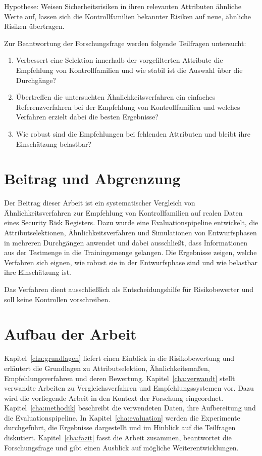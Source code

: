 Hypothese: Weisen Sicherheitsrisiken in ihren relevanten Attributen ähnliche
Werte auf, lassen sich die Kontrollfamilien bekannter Risiken auf neue, ähnliche
Risiken übertragen.

Zur Beantwortung der Forschungsfrage werden folgende Teilfragen untersucht:

\begin{enumerate}
  \item\label{tf: attribute} Verbessert eine Selektion innerhalb der vorgefilterten Attribute die Empfehlung von Kontrollfamilien und wie stabil ist die Auswahl über die Durchgänge?
  \item\label{tf: methoden} Übertreffen die untersuchten Ähnlichkeitsverfahren ein einfaches Referenzverfahren bei der Empfehlung von Kontrollfamilien und welches Verfahren erzielt dabei die besten Ergebnisse?
  \item\label{tf: robustheit} Wie robust sind die Empfehlungen bei fehlenden Attributen und bleibt ihre Einschätzung belastbar?
\end{enumerate}

\section{Beitrag und Abgrenzung}\label{sec:beitrag}
Der Beitrag dieser Arbeit ist ein systematischer Vergleich von Ähnlichkeitsverfahren zur Empfehlung von Kontrollfamilien auf realen Daten eines Security Risk Registers.
Dazu wurde eine Evaluationspipeline entwickelt, die Attributselektionen, Ähnlichkeitsverfahren und Simulationen von Entwurfsphasen in mehreren Durchgängen anwendet und dabei ausschließt, dass Informationen aus der Testmenge in die Trainingsmenge gelangen.
Die Ergebnisse zeigen, welche Verfahren sich eignen, wie robust sie in der Entwurfsphase sind und wie belastbar ihre Einschätzung ist.

Das Verfahren dient ausschließlich als Entscheidungshilfe für Risikobewerter und soll keine Kontrollen vorschreiben.

\section{Aufbau der Arbeit}\label{sec:aufbau}
Kapitel~\ref{cha:grundlagen} liefert einen Einblick in die Risikobewertung und erläutert die Grundlagen zu Attributselektion, Ähnlichkeitsmaßen, Empfehlungsverfahren und deren Bewertung.
Kapitel~\ref{cha:verwandt} stellt verwandte Arbeiten zu Vergleichsverfahren und Empfehlungssystemen vor.
Dazu wird die vorliegende Arbeit in den Kontext der Forschung eingeordnet.
Kapitel~\ref{cha:methodik} beschreibt die verwendeten Daten, ihre Aufbereitung und die Evaluationspipeline.
In Kapitel~\ref{cha:evaluation} werden die Experimente durchgeführt, die Ergebnisse dargestellt und im Hinblick auf die Teilfragen diskutiert.
Kapitel~\ref{cha:fazit} fasst die Arbeit zusammen, beantwortet die Forschungsfrage und gibt einen Ausblick auf mögliche Weiterentwicklungen.